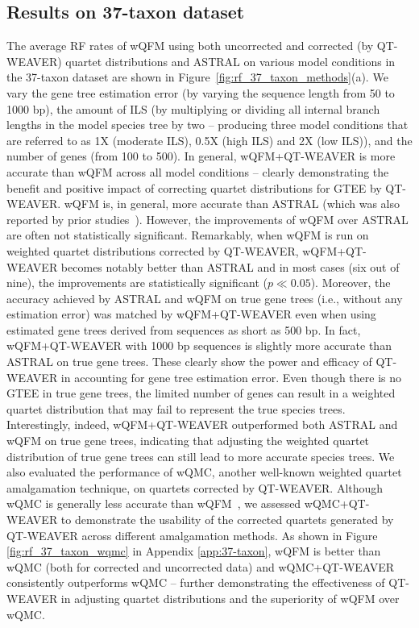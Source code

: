 \documentclass[10pt,a4paper]{article}
\begin{document}
\subsection{Results on 37-taxon dataset}
The average RF rates of wQFM using both uncorrected and corrected (by QT-WEAVER) quartet distributions and ASTRAL on various model conditions in the 37-taxon dataset are shown in Figure~\ref{fig:rf_37_taxon_methods}(a). %
We vary the gene tree estimation error (by varying the sequence length from 50 to 1000 bp), the amount of ILS (by multiplying or dividing all internal branch lengths in the model species tree by two -- producing three model conditions that are referred to as 1X (moderate ILS), 0.5X (high ILS) and 2X (low ILS)), and the number of genes (from 100 to 500). In general, wQFM+QT-WEAVER is more accurate than wQFM across all model conditions -- clearly demonstrating the benefit and positive impact of correcting quartet distributions for GTEE by QT-WEAVER. wQFM is, in general, more accurate than ASTRAL (which was also reported by prior studies~\cite{wqfm,mahbub2022qt}). However, the improvements of wQFM over ASTRAL are often not statistically significant. Remarkably, when wQFM is run on weighted quartet distributions corrected by QT-WEAVER, wQFM+QT-WEAVER becomes notably better than ASTRAL and in most cases (six out of nine), the improvements are statistically significant ($p \ll 0.05$). Moreover, the accuracy achieved by ASTRAL and wQFM on true gene trees (i.e., without any estimation error) was matched by wQFM+QT-WEAVER even when using estimated gene trees derived from sequences as short as 500 bp. In fact, wQFM+QT-WEAVER with 1000 bp sequences is slightly more accurate than ASTRAL on true gene trees. These clearly show the power and efficacy of QT-WEAVER in accounting for gene tree estimation error. %
Even though there is no GTEE in true gene trees, the limited number of genes can result in a weighted quartet distribution that may fail to represent the true species trees. 
Interestingly, indeed, wQFM+QT-WEAVER outperformed both ASTRAL and wQFM on true gene trees, indicating that adjusting the weighted quartet distribution of true gene trees can still lead to more accurate species trees. We also evaluated the performance of wQMC, another well-known weighted quartet amalgamation technique, on quartets corrected by QT-WEAVER. Although wQMC is generally less accurate than wQFM~\cite{wqfm,mahbub2022qt}, we assessed wQMC+QT-WEAVER to demonstrate the usability of the corrected quartets generated by QT-WEAVER across different amalgamation methods. %
As shown in Figure \ref{fig:rf_37_taxon_wqmc} in Appendix \ref{app:37-taxon}, wQFM is better than wQMC (both for corrected and uncorrected data) and wQMC+QT-WEAVER consistently outperforms wQMC -- further demonstrating the effectiveness of QT-WEAVER in adjusting quartet distributions and the superiority of wQFM over wQMC.
\end{document}
